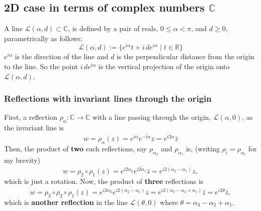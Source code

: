 \documentclass{article}
\begin{document}
\subsection{2D case in terms of complex numbers $\mathbb{C}$}
\label{sec-3-1}
A line $\mathcal{L}(\alpha, d) \subset \mathbb{C}$, is defined by a pair of reals, $0 \le \alpha < \pi$, and $d \ge 0$, parametrically as follows:
\begin{equation}
\mathcal{L}(\alpha, d) := \{ e^{i\alpha}t + i \, d e^{i\alpha} \mid t \in \mathbb{R} \}
\end{equation}
$e^{i\alpha}$ is the direction of the line and $d$ is the perpendicular distance from the origin to the line. So the point $i\, d e^{i\alpha}$ is the vertical projection of the origin onto $\mathcal{L}(\alpha, d)$.
\subsubsection{Reflections with invariant lines through the origin}
\label{sec-3-1-1}
First, a reflection $\rho_{\alpha}:\mathbb{C} \rightarrow \mathbb{C}$ with a line passing through the origin, $\mathcal{L}(\alpha, 0)$, as the invariant line is
\begin{equation}
w = \rho_{\alpha} (z) = e^{i\alpha} \overline{e^{-i\alpha} z} = e^{i2\alpha} \bar{z}
\end{equation}
Then, the product of \textbf{two} such reflections, say $\rho_{\alpha_{2}}$ and $\rho_{\alpha_{1}}$ is, (writing $\rho_{i} = \rho_{\alpha_{i}}$ for my brevity)
\begin{equation}
w = \rho_{2} \circ \rho_{1} (z) = e^{i2\alpha_{2}} \overline{e^{i2\alpha_{1}} \bar{z}} = e^{i2(\alpha_{2} - \alpha_{1})} z,
\end{equation}
which is just a rotation. Now, the product of \textbf{three} reflections is
\begin{equation}
w = \rho_{3} \circ \rho_{2} \circ \rho_{1} (z) = e^{i2\alpha_{3}} \overline{e^{i2(\alpha_{2} - \alpha_{1})} z} = e^{i2(\alpha_{3} - \alpha_{2} + \alpha_{1})} \bar{z} = e^{i2\theta} \bar{z},
\end{equation}
which is \textbf{another reflection} in the line $\mathcal{L}(\theta, 0)$ where $\theta = \alpha_{3} - \alpha_{2} + \alpha_{1}$.\\
\end{document}

